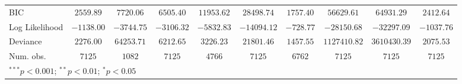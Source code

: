 \begin{tabular}{l c c c c c c c c c}
BIC              & $2559.89$     & $7720.06$     & $6505.40$     & $11953.62$    & $28498.74$    & $1757.40$      & $56629.61$    & $64931.29$     & $2412.64$      \\
Log Likelihood   & $-1138.00$    & $-3744.75$    & $-3106.32$    & $-5832.83$    & $-14094.12$   & $-728.77$      & $-28150.68$   & $-32297.09$    & $-1037.76$     \\
Deviance         & $2276.00$     & $64253.71$    & $6212.65$     & $3226.23$     & $21801.46$    & $1457.55$      & $1127410.82$  & $3610430.39$   & $2075.53$      \\
Num. obs.        & $7125$        & $1082$        & $7125$        & $4766$        & $7125$        & $6762$         & $7125$        & $7125$         & $7125$         \\
\bottomrule
\multicolumn{10}{l}{\scriptsize{$^{***}p<0.001$; $^{**}p<0.01$; $^{*}p<0.05$}}
\end{tabular}
